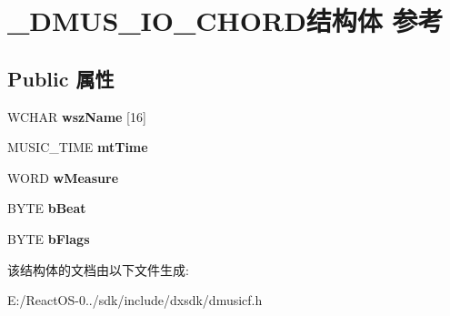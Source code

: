 \hypertarget{struct___d_m_u_s___i_o___c_h_o_r_d}{}\section{\+\_\+\+D\+M\+U\+S\+\_\+\+I\+O\+\_\+\+C\+H\+O\+R\+D结构体 参考}
\label{struct___d_m_u_s___i_o___c_h_o_r_d}
\subsection*{Public 属性}
\begin{DoxyCompactItemize}
\item 
\mbox{\label{struct___d_m_u_s___i_o___c_h_o_r_d_a383ac782ad79183f07b94db0cdd135cd}} 
W\+C\+H\+AR {\bfseries wsz\+Name} \mbox{[}16\mbox{]}
\item 
\mbox{\label{struct___d_m_u_s___i_o___c_h_o_r_d_a93d42d064c64b06679ba068740c6ff7b}} 
M\+U\+S\+I\+C\+\_\+\+T\+I\+ME {\bfseries mt\+Time}
\item 
\mbox{\label{struct___d_m_u_s___i_o___c_h_o_r_d_a0259d7aeabccf29bcfc6831b4c2d12f1}} 
W\+O\+RD {\bfseries w\+Measure}
\item 
\mbox{\label{struct___d_m_u_s___i_o___c_h_o_r_d_a2f4bd81997f34864ad3dca6608f1f658}} 
B\+Y\+TE {\bfseries b\+Beat}
\item 
\mbox{\label{struct___d_m_u_s___i_o___c_h_o_r_d_a6ba3f3f9aea2dfc5ee6c7be13ad81b56}} 
B\+Y\+TE {\bfseries b\+Flags}
\end{DoxyCompactItemize}


该结构体的文档由以下文件生成\+:\begin{DoxyCompactItemize}
\item 
E\+:/\+React\+O\+S-\/0../sdk/include/dxsdk/dmusicf.\+h\end{DoxyCompactItemize}
